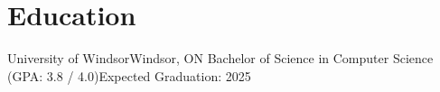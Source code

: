 \section{Education}
\resumeSubHeadingListStart

\resumeSubheading
{University of Windsor}{Windsor, ON}
{Bachelor of Science in Computer Science \textnormal{(GPA: 3.8 / 4.0)}}{Expected Graduation: 2025}
\resumeItemListStart
\resumeItemListEnd

\resumeSubHeadingListEnd
